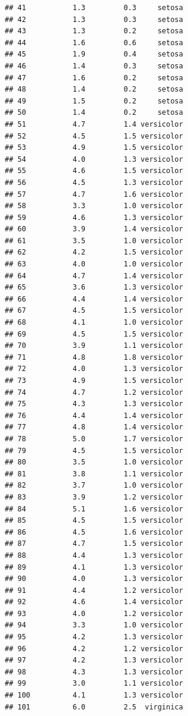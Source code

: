 \documentclass[krantz2]{krantz}\usepackage{knitr}%
\begin{document}
\begin{knitrout}
\begin{kframe}
\begin{verbatim}
## 41           1.3         0.3     setosa
## 42           1.3         0.3     setosa
## 43           1.3         0.2     setosa
## 44           1.6         0.6     setosa
## 45           1.9         0.4     setosa
## 46           1.4         0.3     setosa
## 47           1.6         0.2     setosa
## 48           1.4         0.2     setosa
## 49           1.5         0.2     setosa
## 50           1.4         0.2     setosa
## 51           4.7         1.4 versicolor
## 52           4.5         1.5 versicolor
## 53           4.9         1.5 versicolor
## 54           4.0         1.3 versicolor
## 55           4.6         1.5 versicolor
## 56           4.5         1.3 versicolor
## 57           4.7         1.6 versicolor
## 58           3.3         1.0 versicolor
## 59           4.6         1.3 versicolor
## 60           3.9         1.4 versicolor
## 61           3.5         1.0 versicolor
## 62           4.2         1.5 versicolor
## 63           4.0         1.0 versicolor
## 64           4.7         1.4 versicolor
## 65           3.6         1.3 versicolor
## 66           4.4         1.4 versicolor
## 67           4.5         1.5 versicolor
## 68           4.1         1.0 versicolor
## 69           4.5         1.5 versicolor
## 70           3.9         1.1 versicolor
## 71           4.8         1.8 versicolor
## 72           4.0         1.3 versicolor
## 73           4.9         1.5 versicolor
## 74           4.7         1.2 versicolor
## 75           4.3         1.3 versicolor
## 76           4.4         1.4 versicolor
## 77           4.8         1.4 versicolor
## 78           5.0         1.7 versicolor
## 79           4.5         1.5 versicolor
## 80           3.5         1.0 versicolor
## 81           3.8         1.1 versicolor
## 82           3.7         1.0 versicolor
## 83           3.9         1.2 versicolor
## 84           5.1         1.6 versicolor
## 85           4.5         1.5 versicolor
## 86           4.5         1.6 versicolor
## 87           4.7         1.5 versicolor
## 88           4.4         1.3 versicolor
## 89           4.1         1.3 versicolor
## 90           4.0         1.3 versicolor
## 91           4.4         1.2 versicolor
## 92           4.6         1.4 versicolor
## 93           4.0         1.2 versicolor
## 94           3.3         1.0 versicolor
## 95           4.2         1.3 versicolor
## 96           4.2         1.2 versicolor
## 97           4.2         1.3 versicolor
## 98           4.3         1.3 versicolor
## 99           3.0         1.1 versicolor
## 100          4.1         1.3 versicolor
## 101          6.0         2.5  virginica

\end{verbatim}
\end{kframe}
\end{knitrout}
\end{document}
